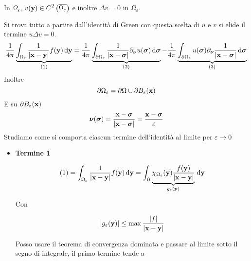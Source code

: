 \begin{dimostrazione}
\begin{figure}[H]
\begin{tikzpicture}[x=0.75pt,y=0.75pt,yscale=-1,xscale=1]
        \end{tikzpicture}
    \end{figure}
    \FloatBarrier

    In $\displaystyle \Omega _{\varepsilon }$, $\displaystyle v(\y) \in C^{2}\left(\overline{\Omega _{\varepsilon }}\right)$ e inoltre $\displaystyle \Delta v=0$ in $\displaystyle \Omega _{\varepsilon }$.

    Si trova tutto a partire dall'identità di Green con questa scelta di $u$ e $v$ si elide il termine $\displaystyle u\Delta v=0$.
    \begin{equation*}
        \frac{1}{4\pi }\underbrace{\int _{\Omega _{\varepsilon }}\frac{1}{| \x -\y| } f(\y) \dyy}_{(1)} =\frac{1}{4\pi }\underbrace{\int _{\partial \Omega _{\varepsilon }}\frac{1}{| \x -\sigg| } \partial _{\nuu} u(\sigg) \dsig}_{(2)} -\frac{1}{4\pi }\underbrace{\int _{\partial \Omega _{\varepsilon }} u(\sigg) \partial _{\nuu}\frac{1}{| \x -\sigg| } \dsig}_{(3)}
    \end{equation*}
    Inoltre
    \begin{equation*}
        \partial \Omega _{\varepsilon } =\partial \Omega \cup \partial B_{\varepsilon }(\x)
    \end{equation*}
    E su $\displaystyle \partial B_{\varepsilon }(\x)$
    \begin{equation*}
        \nuu(\sigg) =\frac{\x -\sigg}{| \x -\sigg| } =\frac{\x -\sigg}{\varepsilon }
    \end{equation*}
    Studiamo come si comporta ciascun termine dell'identità al limite per $\displaystyle \varepsilon \rightarrow 0$
    \begin{itemize}
        \item \textbf{Termine 1}

              \begin{equation*}
                  (1) =\int _{\Omega _{\varepsilon }}\frac{1}{| \x -\y| } f(\y) \dyy =\int _{\Omega }\underbrace{\chi _{\Omega _{\varepsilon }}(\y)\frac{f(\y)}{| \x -\y| }}_{g_{\varepsilon }(\y)} \dyy
              \end{equation*}

              Con

              \begin{equation*}
                  | g_{\varepsilon }(\y)| \leq \max\frac{| f| }{| \x -\y| }
              \end{equation*}

              Posso usare il teorema di convergenza dominata e passare al limite sotto il segno di integrale, il primo termine tende a


\end{itemize}
\end{dimostrazione}
